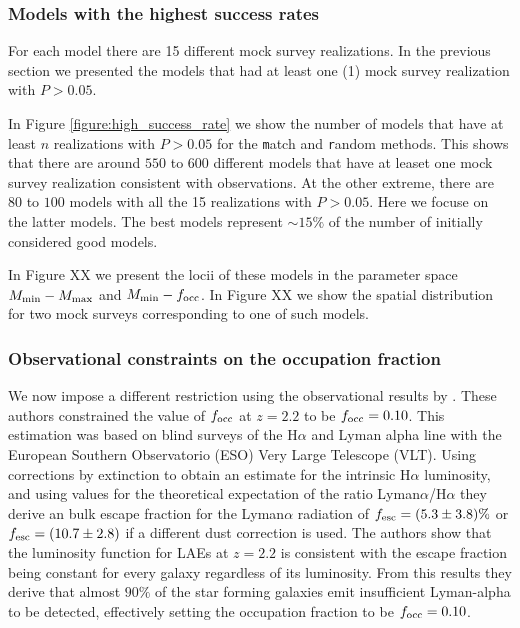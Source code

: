 \documentclass[usenatbib]{mn2e}
\begin{document}
\subsubsection{Models with the highest success rates}

For each model there are 15 different mock survey realizations. In the
previous section we presented the models that had at least one (1)
mock survey realization with $P>0.05$.

In Figure \ref{figure:high_success_rate} we show the number of models
that have at least $n$ realizations with $P>0.05$ for the {\texttt
  match} and {\texttt random} methods.  This shows that there are
around $550$ to $600$ different models that have at leaset one mock
survey realization consistent with observations. At the other extreme,
there are $80$ to $100$ models with all the 15 realizations with
$P>0.05$. Here we focuse on the latter models. The best models
represent $\sim 15\%$ of the number of initially considered good
models. 

In Figure XX we present the locii of these models in the parameter
space $M_{\rm min}-M_{\rm max}$ and $M_{\rm min}-f_{\rm occ}$. In
Figure XX we show the spatial distribution for two mock surveys
corresponding to one of such models. 




\subsubsection{Observational constraints on the occupation fraction}

We now impose a different restriction using the observational results
by \cite{Hayes2010}. These authors constrained the value of $f_{\rm
  occ}$ at $z=2.2$ to be $f_{\rm occ}=0.10$. This estimation was based
on blind surveys of the H$\alpha$ and Lyman alpha line with the European Southern
Observatorio (ESO) Very Large Telescope (VLT). Using corrections by
extinction to obtain an estimate for the intrinsic H$\alpha$
luminosity, and using values for the theoretical expectation of the
ratio Lyman$\alpha$/H$\alpha$ they derive an bulk escape fraction for
the Lyman$\alpha$ radiation of $f_{\rm esc}=(5.3\pm 3.8)\%$ or $f_{\rm
esc}=(10.7\pm 2.8)$ if a different dust correction is used. The
authors show that the luminosity function for LAEs at $z=2.2$ is
consistent with the escape fraction being constant for every galaxy
regardless of its luminosity. From this results they derive that
almost $90\%$ of the star forming galaxies emit insufficient
Lyman-alpha to be detected, effectively setting the occupation
fraction to be $f_{\rm occ}=0.10$.  
\end{document}
